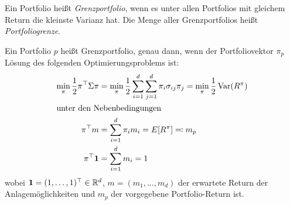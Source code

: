 \documentclass[a4paper,twoside,DIV15,BCOR12mm]{scrbook}
\DeclareMathOperator{\Var}{Var}
\begin{document}
\begin{definition}
Ein Portfolio heißt \emph{Grenzportfolio}, wenn es unter allen Portfolios mit gleichem Return die kleinste Varianz hat. Die Menge aller Grenzportfolios heißt \emph{Portfoliogrenze}.
\end{definition}

\begin{satz}
Ein Portfolio $p$ heißt Grenzportfolio, genau dann, wenn der Portfoliovektor $\pi_p$ Lösung des folgenden Optimierungsproblems ist:
\begin{align*}
\min_{\pi} \frac 12 \pi^\top \Sigma \pi &= \min_\pi \frac 12 \sum_{i=1}^d\sum_{j=1}^d \pi_i \sigma_{ij}\pi_j = \min_\pi \frac 12 \Var(R^\pi) \\
\intertext{unter den Nebenbedingungen}
\pi^\top m &= \sum_{i=1}^d \pi_im_i = E[R^\pi]\ad m_p \\
\pi^\top \mathbf 1 &= \sum_{i=1}^d m_i = 1
\end{align*}
wobei $\mathbf 1=(1,\ldots,1)^\top\in\mathbb{R}^d$, $m=(m_1,\ldots,m_d)$ der erwartete Return der Anlagemöglichkeiten und $m_p$ der vorgegebene Portfolio-Return ist.
\end{satz}
\end{document}
